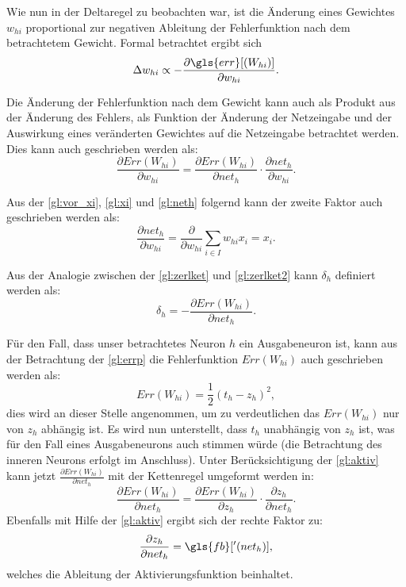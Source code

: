 Wie nun in der Deltaregel zu beobachten war, ist die Änderung eines Gewichtes $w_{hi}$ proportional zur negativen Ableitung der Fehlerfunktion nach dem betrachtetem Gewicht. Formal betrachtet ergibt sich
\begin{equation*}
\Delta w_{hi} \propto -  \frac{\partial \gls{err}[(W_{hi})]}{\partial w_{hi}}.
\end{equation*}

Die Änderung der Fehlerfunktion nach dem Gewicht kann auch als Produkt aus der Änderung des Fehlers, als Funktion der Änderung der Netzeingabe und der Auswirkung eines veränderten Gewichtes auf die Netzeingabe betrachtet werden. Dies kann auch geschrieben werden als:
\begin{equation}
\frac{\partial Err(W_{hi})}{\partial w_{hi}} = \frac{\partial Err(W_{hi})}{\partial net_{h}} \cdot \frac{\partial net_{h}}{\partial w_{hi}}.
\label{gl:zerlket2}
\end{equation}

Aus der \autoref{gl:vor_xi}, \autoref{gl:xi} und \autoref{gl:neth} folgernd kann der zweite Faktor auch geschrieben werden als:
\begin{equation}
\frac{\partial net_{h}}{\partial w_{hi}} = \frac{\partial }{\partial w_{hi}} \sum\limits_{i \in I} w_{hi} x_{i} = x_{i} .
\label{gl:ok_bak}
\end{equation}

Aus der Analogie zwischen der \autoref{gl:zerlket} und \autoref{gl:zerlket2} kann $\delta_{h}$ definiert werden als:
\begin{equation}
\delta_{h}= -\frac{\partial Err(W_{hi})}{\partial net_{h}}  .
\label{gl:deltah_bak}
\end{equation}

Für den Fall, dass unser betrachtetes Neuron $h$ ein Ausgabeneuron ist, kann aus der Betrachtung der \autoref{gl:errp} die Fehlerfunktion $Err(W_{hi})$ auch geschrieben werden als:
\begin{equation}
Err(W_{hi})= \frac{1}{2} (t_{h}-z_{h})^2 ,
\label{gl:fehler_bak}
\end{equation}
dies wird an dieser Stelle angenommen, um zu verdeutlichen das $Err(W_{hi})$ nur von $z_{h}$ abhängig ist. Es wird nun unterstellt, dass $t_h$ unabhängig von $z_h$ ist, was für den Fall eines Ausgabeneurons auch stimmen würde (die Betrachtung des inneren Neurons erfolgt im Anschluss). Unter Berücksichtigung der \autoref{gl:aktiv} kann jetzt $\frac{\partial Err(W_{hi})}{\partial net_{h}}$ mit der Kettenregel umgeformt werden in:
\begin{equation}
\frac{\partial Err(W_{hi})}{\partial net_{h}} = \frac{\partial Err(W_{hi})}{\partial z_{h}} \cdot \frac{\partial z_{h}}{\partial net_{h}}.
\label{gl:ohket_bak}
\end{equation}
Ebenfalls mit Hilfe der \autoref{gl:aktiv} ergibt sich der rechte Faktor zu:
\begin{equation}
\frac{\partial z_{h}}{\partial net_{h}} = \gls{fb}['(net_h)],
\label{gl:aktiv_neth_bak}
\end{equation}
welches die Ableitung der Aktivierungsfunktion beinhaltet.

